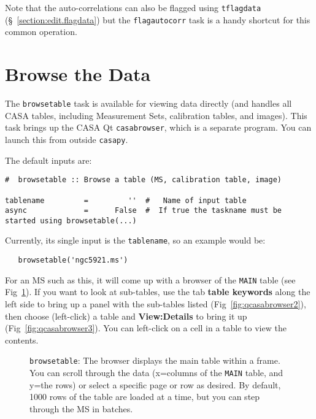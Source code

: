 Note that the auto-correlations can also be flagged using 
{\tt tflagdata} (\S~\ref{section:edit.flagdata}) but the 
{\tt flagautocorr} task is a handy shortcut for this common
operation.



\section{Browse the Data}
\label{section:edit.browse}

The {\tt browsetable} task is available for viewing data directly
(and handles all CASA tables, including Measurement Sets, calibration tables,
and images). This task brings up the CASA Qt
{\tt casabrowser}, which is a separate program.  You can launch this
from outside {\tt casapy}.  

The default inputs are:
\small
\begin{verbatim}
#  browsetable :: Browse a table (MS, calibration table, image)

tablename         =         ''  #   Name of input table
async             =      False  #  If true the taskname must be started using browsetable(...)

\end{verbatim}
\normalsize

Currently, its single input is the {\tt tablename}, so an example would
be:
\small
\begin{verbatim}
   browsetable('ngc5921.ms')
\end{verbatim}
\normalsize
For an MS such as this, it will come up with a browser of the 
{\tt MAIN} table (see Fig~\ref{fig:qcasabrowser1}).  
If you want to look at sub-tables, use the tab 
{\bf table keywords} along the left side to bring up a panel with the sub-tables
listed (Fig~\ref{fig:qcasabrowser2}), then choose (left-click) a table and
{\bf View:Details} to bring it up (Fig~\ref{fig:qcasabrowser3}).  
You can left-click on a cell in a table to view the
contents.

\begin{figure}[h!]
\begin{center}
\caption{\label{fig:qcasabrowser1} {\tt browsetable}: The browser displays
  the main table within a frame. You can scroll
  through the data (x=columns of the {\tt MAIN} table, and y=the rows) or
  select a specific page or row as desired.  By default, 1000 rows of
  the table are loaded at a time, but you can step through the MS in batches.} 
\hrulefill
\end{center}
\end{figure}

